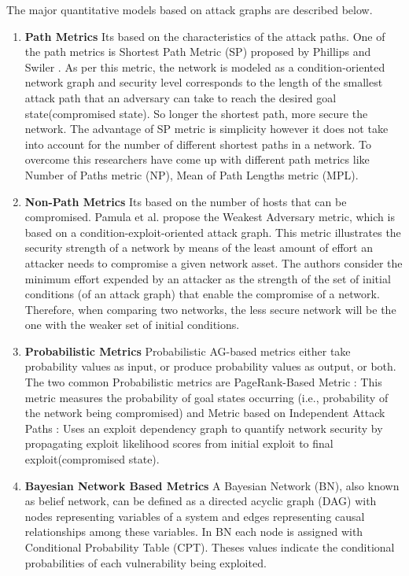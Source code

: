 \documentclass[pdftex,english,oribibl]{llncs}
\begin{document}
The major quantitative models based on attack graphs are described below.
\begin{enumerate}[(1)]
	\item {\textbf{Path Metrics}\newline 
		Its based on the characteristics of the attack paths. One of the path metrics is Shortest Path Metric (SP) proposed by Phillips and Swiler \cite{CynthiaPhillips1998}. As per this metric, the network is modeled as a condition-oriented network graph and security level corresponds to the length of the smallest attack path that an adversary can take to reach the desired goal state(compromised state). So longer the shortest path, more secure the network. The advantage of SP metric is simplicity however it does not take into account for the number of different shortest paths in a network. To overcome this researchers have come up with different path metrics like Number of Paths metric (NP), Mean of Path Lengths metric (MPL).}
	
	\item {\textbf{Non-Path Metrics}\newline 
		Its based on the number of hosts that can be compromised. Pamula et al. \cite{J.Pamula2006} propose the Weakest Adversary metric, which is based on a condition-exploit-oriented attack graph.
		This metric illustrates the security strength of a network by means of the least amount of effort an attacker needs to compromise a given network asset. The authors consider the minimum effort expended by an attacker as the strength of the set of initial conditions (of an attack graph) that enable the compromise of a network. Therefore, when comparing two networks, the less secure network will be the one with the weaker set of initial conditions.}
	
	\item {\textbf{Probabilistic Metrics}\newline
		Probabilistic AG-based metrics either take probability values as input, or produce probability values as output, or both. The two common Probabilistic metrics are PageRank-Based Metric :  This metric measures the probability of goal states occurring	(i.e., probability of the network being compromised) and Metric based on Independent Attack Paths : Uses an exploit dependency graph to quantify network security by propagating exploit likelihood scores from initial exploit to final exploit(compromised state).}
	
		\item {\textbf{Bayesian Network Based Metrics}\newline
		A Bayesian Network (BN), also known as belief network, can be defined as a directed acyclic graph (DAG) with nodes representing variables of a system and edges representing causal relationships among these variables. In BN each node is assigned with Conditional Probability Table (CPT). Theses values indicate the conditional probabilities of each vulnerability being exploited.
		}
\end{enumerate}
\end{document}
